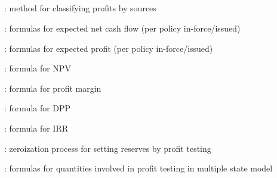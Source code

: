 \subsection*{}
\item {}: method for classifying profits by sources
\item {}: formulas for expected net cash flow (per policy in-force/issued)
\item {}: formulas for expected profit (per policy in-force/issued)
\item {}: formula for NPV
\item {}: formula for profit margin
\item {}: formula for DPP
\item {}: formula for IRR
\item {}: zeroization process for setting reserves by profit testing
\item {}: formulas for quantities involved in profit testing in multiple state model

